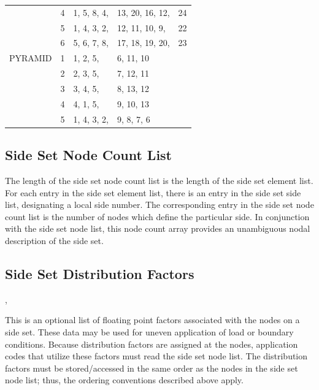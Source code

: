 \begin{table}
\begin{center}
\begin{tabular}{l|c|lll}
       & 4 & 1, 5, 8, 4, & 13, 20, 16, 12, & 24 \\ 
       & 5 & 1, 4, 3, 2, & 12, 11, 10, 9, & 22 \\ 
       & 6 & 5, 6, 7, 8, & 17, 18, 19, 20, & 23 \\ \hline
PYRAMID&1 & 1, 2, 5, & 6, 11, 10 \\ 
       & 2 & 2, 3, 5, & 7, 12, 11 \\ 
       & 3 & 3, 4, 5, & 8, 13, 12 \\ 
       & 4 & 4, 1, 5, & 9, 10, 13 \\ 
       & 5 & 1, 4, 3, 2, & 9, 8, 7, 6
\end{tabular}
\end{center}
\end{table}

\subsection{Side Set Node Count List}


\begin{spacing}{1.5}
\api {}
\end{spacing}

The length of the side set node count list is the length of the side
set element list. For each entry in the side set element list, there
is an entry in the side set side list, designating a local side
number. The corresponding entry in the side set node count list is the
number of nodes which define the particular side. In conjunction with
the side set node list, this node count array provides an unambiguous
nodal description of the side set.

\subsection{Side Set Distribution Factors}


\begin{spacing}{1.5}
\api {}, 
\end{spacing}

This is an optional list of floating point factors associated with the
nodes on a side set. These data may be used for uneven application of
load or boundary conditions. Because distribution factors are assigned
at the nodes, application codes that utilize these factors must read
the side set node list. The distribution factors must be
stored/accessed in the same order as the nodes in the side set node
list; thus, the ordering conventions described above apply.


